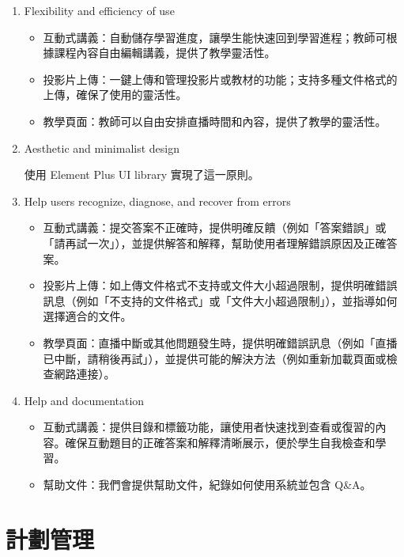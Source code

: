\documentclass[12pt]{article}
\begin{document}
\begin{enumerate}[label=(\arabic*)]
  \item Flexibility and efficiency of use

  \begin{itemize}
    \item 互動式講義：自動儲存學習進度，讓學生能快速回到學習進程；教師可根據課程內容自由編輯講義，提供了教學靈活性。
    \item 投影片上傳：一鍵上傳和管理投影片或教材的功能；支持多種文件格式的上傳，確保了使用的靈活性。
    \item 教學頁面：教師可以自由安排直播時間和內容，提供了教學的靈活性。
  \end{itemize}

  \item Aesthetic and minimalist design

  \par 使用 Element Plus UI library 實現了這一原則。

  \item Help users recognize, diagnose, and recover from errors

  \begin{itemize}
    \item 互動式講義：提交答案不正確時，提供明確反饋（例如「答案錯誤」或「請再試一次」），並提供解答和解釋，幫助使用者理解錯誤原因及正確答案。
    \item 投影片上傳：如上傳文件格式不支持或文件大小超過限制，提供明確錯誤訊息（例如「不支持的文件格式」或「文件大小超過限制」），並指導如何選擇適合的文件。
    \item 教學頁面：直播中斷或其他問題發生時，提供明確錯誤訊息（例如「直播已中斷，請稍後再試」），並提供可能的解決方法（例如重新加載頁面或檢查網路連接）。
  \end{itemize}

  \item Help and documentation

  \begin{itemize}
    \item 互動式講義：提供目錄和標籤功能，讓使用者快速找到查看或復習的內容。確保互動題目的正確答案和解釋清晰展示，便於學生自我檢查和學習。
    \item 幫助文件：我們會提供幫助文件，紀錄如何使用系統並包含 Q\&A。
  \end{itemize}

\end{enumerate}

\section{計劃管理}
\end{document}
